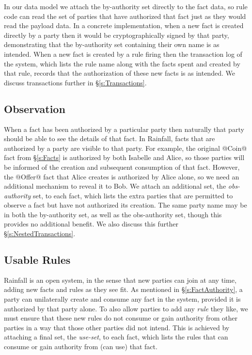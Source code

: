 In our data model we attach the by-authority set directly to the fact data, so rule code can read the set of parties that have authorized that fact just as they would read the payload data. In a concrete implementation, when a new fact is created directly by a party then it would be cryptographically signed by that party, demonstrating that the by-authority set containing their own name is as intended. When a new fact is created by a rule firing then the transaction log of the system, which lists the rule name along with the facts spent and created by that rule, records that the authorization of these new facts is as intended. We discuss transactions further in \S\ref{s:Transactions}.


\subsection{Observation}
\label{s:Observation}
When a fact has been authorized by a particular party then naturally that party should be able to see the details of that fact. In Rainfall, facts that are authorized by a party are visible to that party. For example, the original @Coin@ fact from \S\ref{s:Facts} is authorized by both Isabelle and Alice, so those parties will be informed of the creation and subsequent consumption of that fact. However, the @Offer@ fact that Alice creates is authorized by Alice alone, so we need an additional mechanism to reveal it to Bob. We attach an additional set, the \emph{obs-authority} set, to each fact, which lists the extra parties that are permitted to observe a fact but have not authorized its creation. The same party name may be in both the by-authority set, as well as the obs-authority set, though this provides no additional benefit. We also discuss this further \S\ref{s:NestedTransactions}.



\subsection{Usable Rules}
Rainfall is an open system, in the sense that new parties can join at any time, adding new facts and rules as they see fit. As mentioned in \S\ref{s:FactAuthority}, a party can unilaterally create and consume any fact in the system, provided it is authorized by that party alone. To also allow parties to  add any \emph{rule} they like, we must ensure that these new rules do not consume or gain authority from other parties in a way that those other parties did not intend. This is achieved by attaching a final set, the \emph{use-set}, to each fact, which lists the rules that can consume or gain authority from (can use) that fact.


